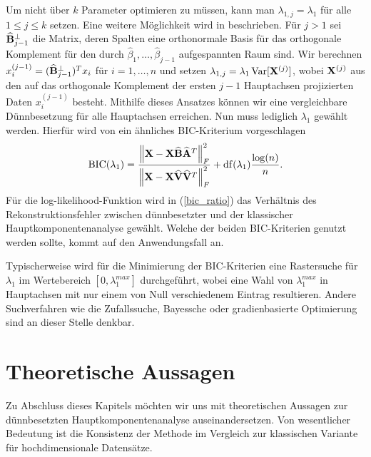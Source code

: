 Um nicht über $k$ Parameter optimieren zu müssen, kann man $\lambda_{1,j} = \lambda_1$ für alle $1 \leq j \leq k$ setzen. Eine weitere Möglichkeit wird in \cite{croux} beschrieben. Für $j>1$ sei $\mathbf{\widehat{B}}_{j-1}^{\perp}$ die Matrix, deren Spalten eine orthonormale Basis für das orthogonale Komplement für den durch $\widehat{\beta}_1, \ldots, \widehat{\beta}_{j-1}$ aufgespannten Raum sind. Wir berechnen $x_i^{(j-1)} = (\mathbf{\widehat{B}}_{j-1}^{\perp})^T x_i$ für $i = 1, \ldots, n$ und setzen $\lambda_{1,j} = \lambda_1\operatorname{Var}[\mathbf{X}^{(j)}]$, wobei $\mathbf{X}^{(j)}$ aus den auf das orthogonale Komplement der ersten $j-1$ Hauptachsen projizierten Daten $x_i^{(j-1)}$ besteht. Mithilfe dieses Ansatzes können wir eine vergleichbare Dünnbesetzung für alle Hauptachsen erreichen. Nun muss lediglich $\lambda_1$ gewählt werden. Hierfür wird von \cite{croux, guo} ein ähnliches BIC-Kriterium vorgeschlagen
\begin{align}
\label{bic_ratio}
\operatorname{BIC}(\lambda_1) = \frac{\left\lVert \mathbf{X} - \mathbf{X} \widehat{\mathbf{B}} \widehat{\mathbf{A}}^T \right\rVert_{F}^{2}}{\left\lVert \mathbf{X} - \mathbf{X} \widehat{\mathbf{V}} \widehat{\mathbf{V}}^T \right\rVert_{F}^{2}} + \operatorname{df}(\lambda_1) \frac{\log(n)}{n}.
\end{align}
Für die log-likelihood-Funktion wird in (\ref{bic_ratio}) das Verhältnis des Rekonstruktionsfehler zwischen dünnbesetzter und der klassischer Hauptkomponentenanalyse gewählt. Welche der beiden BIC-Kriterien genutzt werden sollte, kommt auf den Anwendungsfall an.

Typischerweise wird für die Minimierung der BIC-Kriterien eine Rastersuche für $\lambda_1$ im Wertebereich $[0, \lambda_1^{max}]$ durchgeführt, wobei eine Wahl von $\lambda_1^{max}$ in Hauptachsen mit nur einem von Null verschiedenem Eintrag resultieren. Andere Suchverfahren wie die Zufallssuche, Bayessche oder gradienbasierte Optimierung sind an dieser Stelle denkbar. 




\section{Theoretische Aussagen} 
\label{spca_theorems}


Zu Abschluss dieses Kapitels möchten wir uns mit theoretischen Aussagen zur dünnbesetzten Hauptkomponentenanalyse auseinandersetzen. Von wesentlicher Bedeutung ist die Konsistenz der Methode im Vergleich zur klassischen Variante für hochdimensionale Datensätze.

